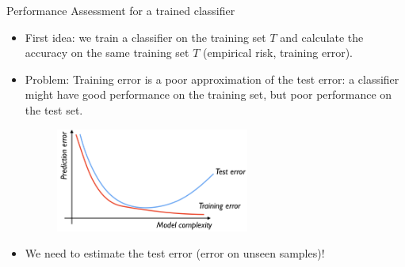 \documentclass[xcolor=pdftex,dvipsnames,table]{beamer}
\begin{document}
\begin{frame}{Performance Assessment for a trained classifier}
	\begin{itemize}
		\item<1-> First idea: we train a classifier on the training set $T$ and calculate the accuracy on the same training set $T$ (empirical risk, training error). 
		\item<2-> Problem: Training error is a poor approximation of the test error: a classifier might have good performance on the training set, but poor performance on the test set.
		\begin{figure}[htb]
			\includegraphics[width=0.6\textwidth]{../graphics/Training_and_test_error.png}
		\end{figure}
		\item<3-> We need to estimate the test error (error on unseen samples)!
	\end{itemize}
\end{frame}
\end{document}
